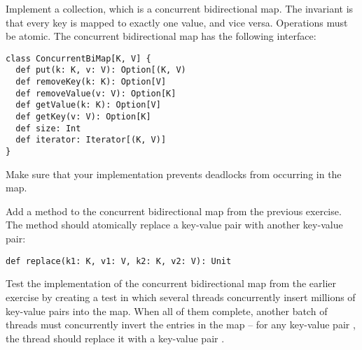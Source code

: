 \documentclass[11pt]{article}
\begin{document}
\begin{myExercise}Implement a  collection, which is a concurrent bidirectional map. The invariant is that every key is mapped to exactly one value, and vice versa. Operations must be atomic. The concurrent bidirectional map has the following interface:
\begin{lstlisting}
class ConcurrentBiMap[K, V] {
  def put(k: K, v: V): Option[(K, V)
  def removeKey(k: K): Option[V]
  def removeValue(v: V): Option[K]
  def getValue(k: K): Option[V]
  def getKey(v: V): Option[K]
  def size: Int
  def iterator: Iterator[(K, V)]
}
\end{lstlisting}
Make sure that your implementation prevents deadlocks from occurring in the map.
\end{myExercise}

\begin{myExercise}Add a  method to the concurrent bidirectional map from the previous exercise. The method should atomically replace a key-value pair with another key-value pair:
\begin{lstlisting}
def replace(k1: K, v1: V, k2: K, v2: V): Unit
\end{lstlisting}
\end{myExercise}

\begin{myExercise}Test the implementation of the concurrent bidirectional map from the earlier exercise by creating a test in which several threads concurrently insert millions of key-value pairs into the map. When all of them complete, another batch of threads must concurrently invert the entries in the map -- for any key-value pair , the thread should replace it with a key-value pair .
\end{myExercise}

\end{document}
